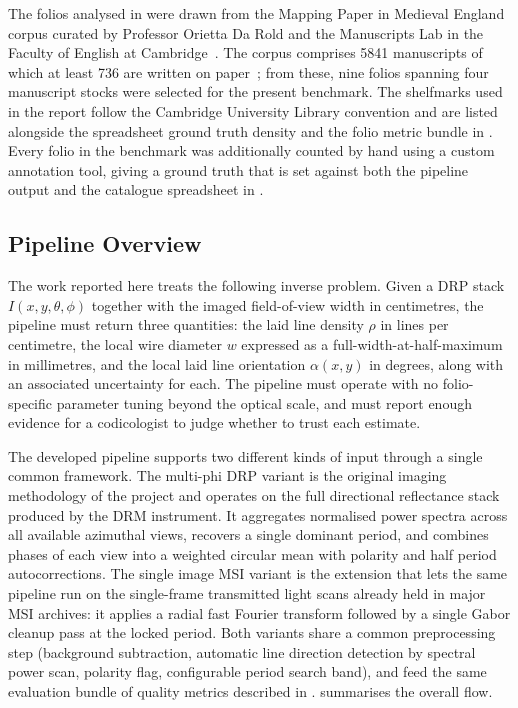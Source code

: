 The folios analysed in  were drawn from the
Mapping Paper in Medieval England corpus curated by Professor
Orietta Da Rold and the Manuscripts Lab in the Faculty of English at
Cambridge~\cite{darold2020paper}. The corpus comprises 5841
manuscripts of which at least 736 are written on
paper~\cite{mappingpaper}; from these, nine folios
spanning four manuscript stocks were selected for the present
benchmark. The shelfmarks used in the report follow the Cambridge
University Library convention and are listed alongside the
spreadsheet ground truth density and the folio metric bundle
in . Every folio in the benchmark
was additionally counted by hand using a custom annotation tool,
giving a ground truth that is set against both
the pipeline output and the catalogue spreadsheet in
.

\subsection{Pipeline Overview}
\label{sec:bg:contributions}

The work reported here treats the following inverse problem. Given
a DRP stack $I(x, y, \theta, \phi)$ together with the imaged
field-of-view width in centimetres, the pipeline must return three
quantities: the laid line density $\rho$ in lines per centimetre,
the local wire diameter $w$ expressed as a full-width-at-half-maximum
in millimetres, and the local laid line orientation $\alpha(x, y)$
in degrees, along with an associated uncertainty for each. The
pipeline must operate with no folio-specific parameter tuning beyond the
optical scale, and must report enough evidence for a codicologist
 to judge whether to trust each estimate.

The developed pipeline supports two different kinds of input
through a single common framework. The multi-phi DRP variant is
the original imaging methodology of the project and operates on the full
directional reflectance stack produced by the DRM instrument. It
aggregates normalised power spectra across all available
azimuthal views, recovers a single dominant period, and combines phases
of each view into a weighted circular mean with polarity and
half period autocorrections. The single image MSI variant is the
extension that lets the same pipeline run on the single-frame
transmitted light scans already held in major MSI archives: it
applies a radial fast Fourier transform followed by a single
Gabor cleanup pass at the locked period. Both variants share a
common preprocessing step (background subtraction, automatic
line direction detection by spectral power scan, polarity flag,
configurable period search band), and feed the same evaluation
bundle of quality metrics described in
. 
summarises the overall flow.

